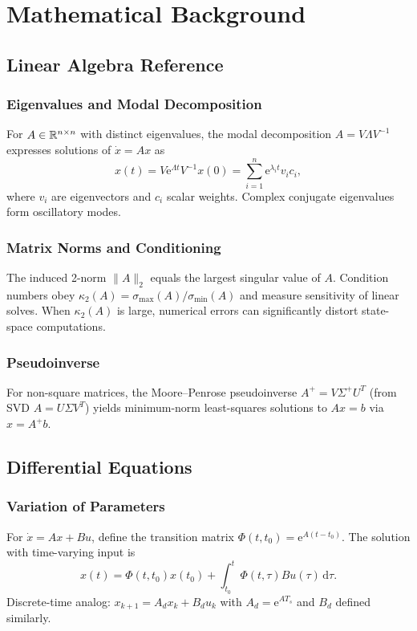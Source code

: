 \chapter{Mathematical Background}
\label{chap:math-appendix}

\section{Linear Algebra Reference}
\subsection{Eigenvalues and Modal Decomposition}
For $A \in \mathbb{R}^{n \times n}$ with distinct eigenvalues, the modal decomposition $A = V \Lambda V^{-1}$ expresses solutions of $\dot{x} = A x$ as
\begin{equation}
    x(t) = V \mathrm{e}^{\Lambda t} V^{-1} x(0) = \sum_{i=1}^{n} \mathrm{e}^{\lambda_i t} v_i c_i,
\end{equation}
where $v_i$ are eigenvectors and $c_i$ scalar weights. Complex conjugate eigenvalues form oscillatory modes.

\subsection{Matrix Norms and Conditioning}
The induced 2-norm $\|A\|_2$ equals the largest singular value of $A$. Condition numbers obey $\kappa_2(A) = \sigma_{\max}(A) / \sigma_{\min}(A)$ and measure sensitivity of linear solves. When $\kappa_2(A)$ is large, numerical errors can significantly distort state-space computations.

\subsection{Pseudoinverse}
For non-square matrices, the Moore--Penrose pseudoinverse $A^+ = V \Sigma^+ U^T$ (from SVD $A = U \Sigma V^T$) yields minimum-norm least-squares solutions to $A x = b$ via $x = A^+ b$.

\section{Differential Equations}
\subsection{Variation of Parameters}
For $\dot{x} = A x + B u$, define the transition matrix $\Phi(t, t_0) = \mathrm{e}^{A (t - t_0)}$. The solution with time-varying input is
\begin{equation}
    x(t) = \Phi(t, t_0) x(t_0) + \int_{t_0}^{t} \Phi(t, \tau) B u(\tau)\, \mathrm{d}\tau.
\end{equation}
Discrete-time analog: $x_{k+1} = A_d x_k + B_d u_k$ with $A_d = \mathrm{e}^{A T_s}$ and $B_d$ defined similarly.

